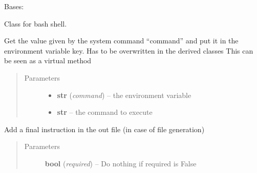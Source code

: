 \documentclass[a4paper,10pt,english]{sphinxmanual}
\begin{document}
\begin{fulllineitems}
\label{commands/apidoc/src:src.fileEnviron.BashFileEnviron}
Bases: {\hyperref[commands/apidoc/src:src.fileEnviron.FileEnviron]{}}

Class for bash shell.

\begin{fulllineitems}
\label{commands/apidoc/src:src.fileEnviron.BashFileEnviron.command_value}
Get the value given by the system command ``command'' 
and put it in the environment variable key.
Has to be overwritten in the derived classes
This can be seen as a virtual method
\begin{quote}\begin{description}
\item[{Parameters}] \leavevmode\begin{itemize}
\item {} 
\textbf{str} (\emph{command}) -- the environment variable

\item {} 
\textbf{str} -- the command to execute

\end{itemize}

\end{description}\end{quote}

\end{fulllineitems}


\begin{fulllineitems}
\label{commands/apidoc/src:src.fileEnviron.BashFileEnviron.finish}
Add a final instruction in the out file (in case of file generation)
\begin{quote}\begin{description}
\item[{Parameters}] \leavevmode
\textbf{bool} (\emph{required}) -- Do nothing if required is False

\end{description}\end{quote}


\end{fulllineitems}
\end{fulllineitems}
\end{document}
